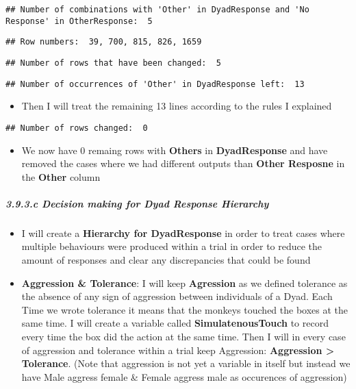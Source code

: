\documentclass[
]{article}
\providecommand{\tightlist}{%
  \setlength{\itemsep}{0pt}\setlength{\parskip}{0pt}}
\begin{document}
\begin{verbatim}
## Number of combinations with 'Other' in DyadResponse and 'No Response' in OtherResponse:  5
\end{verbatim}

\begin{verbatim}
## Row numbers:  39, 700, 815, 826, 1659
\end{verbatim}

\begin{verbatim}
## Number of rows that have been changed:  5
\end{verbatim}

\begin{verbatim}
## Number of occurrences of 'Other' in DyadResponse left:  13
\end{verbatim}

\begin{itemize}
\tightlist
\item
  Then I will treat the remaining 13 lines according to the rules I
  explained
\end{itemize}

\begin{verbatim}
## Number of rows changed:  0
\end{verbatim}

\begin{itemize}
\tightlist
\item
  We now have 0 remaing rows with \textbf{Others} in
  \textbf{DyadResponse} and have removed the cases where we had
  different outputs than \textbf{Other Resposne} in the \textbf{Other}
  column
\end{itemize}

\hypertarget{c-decision-making-for-dyad-response-hierarchy}{%
\subparagraph{3.9.3.c Decision making for Dyad Response
Hierarchy}\label{c-decision-making-for-dyad-response-hierarchy}}

\begin{itemize}
\item
  I will create a \textbf{Hierarchy for DyadResponse} in order to treat
  cases where multiple behaviours were produced within a trial in order
  to reduce the amount of responses and clear any discrepancies that
  could be found
\item
  \textbf{Aggression \& Tolerance}: I will keep \textbf{Agression} as we
  defined tolerance as the absence of any sign of aggression between
  individuals of a Dyad. Each Time we wrote tolerance it means that the
  monkeys touched the boxes at the same time. I will create a variable
  called \textbf{SimulatenousTouch} to record every time the box did the
  action at the same time. Then I will in every case of aggression and
  tolerance within a trial keep Aggression: \textbf{Aggression
  \textgreater{} Tolerance}. (Note that aggression is not yet a variable
  in itself but instead we have Male aggress female \& Female aggress
  male as occurences of aggression)
\end{itemize}
\end{document}
